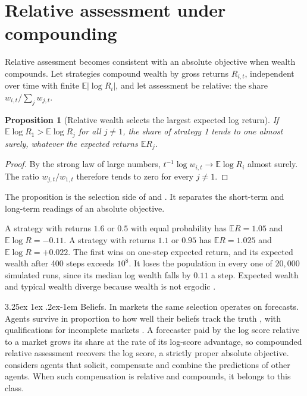 \documentclass[11pt]{article}
\makeatletter
\renewcommand\paragraph{\@startsection{paragraph}{4}{\z@}%
  {3.25ex \@plus1ex \@minus.2ex}{-1em}%
  {\normalfont\normalsize\itshape}}
\newtheorem{proposition}{Proposition}
\theoremstyle{definition}
\theoremstyle{remark}
\newcommand{\E}{\mathbb{E}}
\makeatother
\begin{document}
\section{Relative assessment under compounding}

Relative assessment becomes consistent with an absolute objective when wealth compounds. Let
strategies compound
wealth by gross returns $R_{i,t}$, independent over time with finite $\E|\log R_i|$, and let
assessment be relative: the share $w_{i,t}/\sum_j w_{j,t}$.

\begin{proposition}[Relative wealth selects the largest expected log return]\label{prop:kelly}
If $\E\log R_1>\E\log R_j$ for all $j\neq1$, the share of strategy 1 tends to one almost
surely, whatever the expected returns $\E R_j$.
\end{proposition}

\begin{proof}
By the strong law of large numbers, $t^{-1}\log w_{i,t}\to\E\log R_i$ almost surely. The ratio
$w_{j,t}/w_{1,t}$ therefore tends to zero for every $j\neq1$.
\end{proof}

The proposition is the selection side of \citet{kelly1956information} and
\citet{breiman1961optimal}. It separates the short-term and long-term readings of an absolute
objective.

A strategy with returns $1.6$ or $0.5$ with equal probability has $\E R=1.05$ and
$\E\log R=-0.11$. A strategy with returns $1.1$ or $0.95$ has $\E R=1.025$ and
$\E\log R=+0.022$. The first wins on one-step expected return, and its expected wealth after
400 steps exceeds $10^8$. It loses the population in every one of $20{,}000$ simulated runs,
since its median log wealth falls by $0.11$ a step. Expected wealth and typical wealth
diverge because wealth is not ergodic \citep{peters2019ergodicity}.

\paragraph{Beliefs.} In markets the same selection operates on forecasts. Agents survive in
proportion to how well their beliefs track the truth
\citep{blume1992evolution,sandroni2000markets}, with qualifications for incomplete markets
\citep{blume2006smart}. A forecaster paid by the log score relative to a market grows its share
at the rate of its log-score advantage, so compounded relative assessment recovers the log
score, a strictly proper absolute objective. \citet[ch.~5]{cotton2022microprediction} considers agents that solicit, compensate and
combine the predictions of other agents. When such compensation is relative and compounds, it
belongs to this class.
\end{document}
